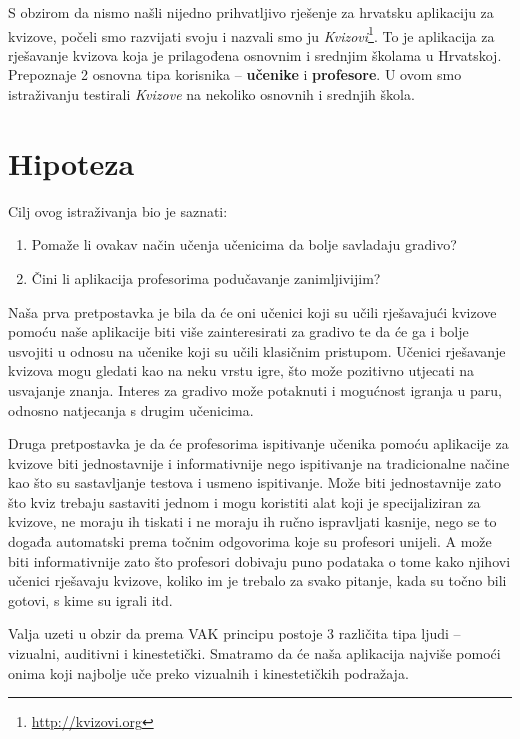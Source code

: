 \documentclass{scrreprt}
\begin{document}
S obzirom da nismo našli nijedno prihvatljivo rješenje za hrvatsku aplikaciju
za kvizove, počeli smo razvijati svoju i nazvali smo ju
\emph{Kvizovi}\footnote{\url{http://kvizovi.org}}. To je aplikacija za
rješavanje kvizova koja je prilagođena osnovnim i srednjim školama u Hrvatskoj.
Prepoznaje 2 osnovna tipa korisnika -- \textbf{učenike} i \textbf{profesore}. U
ovom smo istraživanju testirali \emph{Kvizove} na nekoliko osnovnih i srednjih
škola.

\chapter{Hipoteza}

Cilj ovog istraživanja bio je saznati:

\begin{enumerate}
  \item Pomaže li ovakav način učenja učenicima da bolje savladaju gradivo?
  \item Čini li aplikacija profesorima podučavanje zanimljivijim?
\end{enumerate}

Naša prva pretpostavka je bila da će oni učenici koji su učili rješavajući
kvizove pomoću naše aplikacije biti više zainteresirati za gradivo te da će ga
i bolje usvojiti u odnosu na učenike koji su učili klasičnim pristupom. Učenici
rješavanje kvizova mogu gledati kao na neku vrstu igre, što može pozitivno
utjecati na usvajanje znanja. Interes za gradivo može potaknuti i mogućnost
igranja u paru, odnosno natjecanja s drugim učenicima.

Druga pretpostavka je da će profesorima ispitivanje učenika pomoću aplikacije za
kvizove biti jednostavnije i informativnije nego ispitivanje na tradicionalne
načine kao što su sastavljanje testova i usmeno ispitivanje. Može biti
jednostavnije zato što kviz trebaju sastaviti jednom i mogu koristiti alat koji
je specijaliziran za kvizove, ne moraju ih tiskati i ne moraju ih ručno
ispravljati kasnije, nego se to događa automatski prema točnim odgovorima koje
su profesori unijeli. A može biti informativnije zato što profesori dobivaju
puno podataka o tome kako njihovi učenici rješavaju kvizove, koliko im je
trebalo za svako pitanje, kada su točno bili gotovi, s kime su igrali itd.

Valja uzeti u obzir da prema VAK principu postoje 3 različita tipa ljudi --
vizualni, auditivni i kinestetički.\cite{clark11} Smatramo da će naša aplikacija
najviše pomoći onima koji najbolje uče preko vizualnih i kinestetičkih
podražaja.
\end{document}
